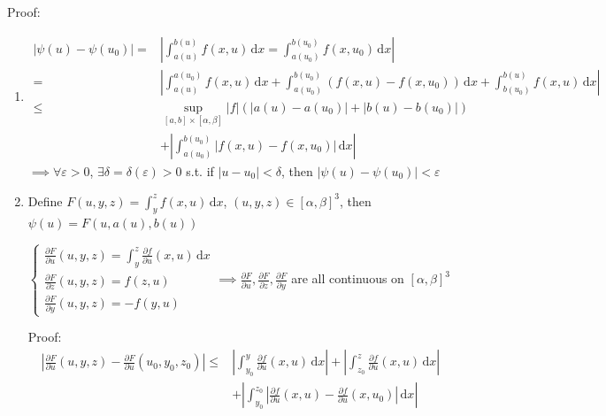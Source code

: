 Proof:
\begin{enumerate}
    \item \begin{align*}
              \left|\psi(u)-\psi(u_0)\right|= & \left|\int_{a(u)}^{b(u)}f(x,u)\,\mathrm{d}x=\int_{a(u_0)}^{b(u_0)}f(x,u_0)\,\mathrm{d}x\right|                                                               \\
              =                               & \left|\int_{a(u)}^{a(u_0)}f(x,u)\,\mathrm{d}x+\int_{a(u_0)}^{b(u_0)}\left(f(x,u)-f(x,u_0)\right)\,\mathrm{d}x+\int_{b(u_0)}^{b(u)}f(x,u)\,\mathrm{d}x\right| \\
              \leq                            & \sup_{[a,b]\times[\alpha,\beta]}|f|\left(\left|a(u)-a(u_0)\right|+\left|b(u)-b(u_0)\right|\right)                                                            \\
                                              & +\left|\int_{a(u_0)}^{b(u_0)}\left|f(x,u)-f(x,u_0)\right|\,\mathrm{d}x\right|
          \end{align*}
          $\implies\forall\varepsilon>0$, $\exists\delta=\delta(\varepsilon)>0$ s.t. if $\left|u-u_0\right|<\delta$, then $\left|\psi(u)-\psi(u_0)\right|<\varepsilon$
    \item Define $F(u,y,z)=\int_y^z f(x,u)\,\mathrm{d}x$, $(u,y,z)\in[\alpha,\beta]^3$, then $\psi(u)=F(u,a(u),b(u))$

          $\begin{cases}
                  \frac{\partial F}{\partial u}(u,y,z)=\int_y^z\frac{\partial f}{\partial u}(x,u)\,\mathrm{d}x \\
                  \frac{\partial F}{\partial z}(u,y,z)=f(z,u)                                                  \\
                  \frac{\partial F}{\partial y}(u,y,z)=-f(y,u)
              \end{cases}\implies\frac{\partial F}{\partial u},\frac{\partial F}{\partial z},\frac{\partial F}{\partial y}$ are all continuous on $[\alpha,\beta]^3$

          Proof:
          \begin{align*}
              \left|\frac{\partial F}{\partial u}(u,y,z)-\frac{\partial F}{\partial u}(u_0,y_0,z_0)\right|\leq & \left|\int_{y_0}^y\frac{\partial f}{\partial u}(x,u)\,\mathrm{d}x\right|+\left|\int_{z_0}^z\frac{\partial f}{\partial u}(x,u)\,\mathrm{d}x\right| \\
                                                                                                               & +\left|\int_{y_0}^{z_0}\left|\frac{\partial f}{\partial u}(x,u)-\frac{\partial f}{\partial u}(x,u_0)\right|\,\mathrm{d}x\right|
          \end{align*}
\end{enumerate}

